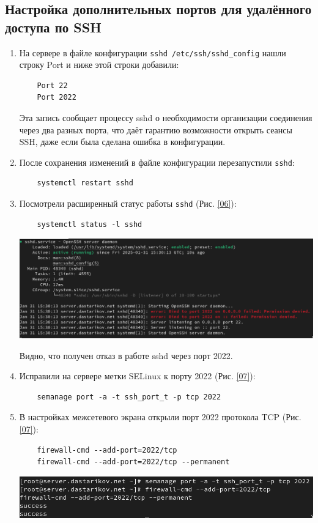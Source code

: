 \subsection{Настройка дополнительных портов для удалённого доступа по SSH}
\begin{enumerate}
\item На сервере в файле конфигурации \texttt{sshd /etc/ssh/sshd\_config} нашли строку Port и ниже этой строки добавили:
  \begin{verbatim}
    Port 22
    Port 2022
  \end{verbatim}
  Эта запись сообщает процессу sshd о необходимости организации соединения через два разных порта, что даёт гарантию возможности открыть сеансы SSH, даже если была сделана ошибка в конфигурации.
\item После сохранения изменений в файле конфигурации перезапустили \texttt{sshd}:
  \begin{verbatim}
    systemctl restart sshd
  \end{verbatim}
\item Посмотрели расширенный статус работы \texttt{sshd} (Рис. \ref{06}):
  \begin{verbatim}
    systemctl status -l sshd
  \end{verbatim}
\begin{center}
  \centering
  \includegraphics[width=\textwidth]{../images/image06.png}
  \label{06}
\end{center}
Видно, что получен отказ в работе sshd через порт 2022. 
\item Исправили на сервере метки SELinux к порту 2022 (Рис. \ref{07}):
  \begin{verbatim}
    semanage port -a -t ssh_port_t -p tcp 2022
  \end{verbatim}
\item В настройках межсетевого экрана открыли порт 2022 протокола TCP (Рис. \ref{07}):
  \begin{verbatim}
    firewall-cmd --add-port=2022/tcp
    firewall-cmd --add-port=2022/tcp --permanent
  \end{verbatim}
\begin{center}
  \centering
  \includegraphics[width=\textwidth]{../images/image07.png}
  \label{07}
\end{center}


\end{enumerate}
